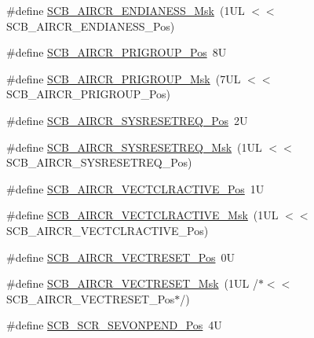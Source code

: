 \begin{DoxyCompactItemize}
\item 
\#define \hyperlink{group___c_m_s_i_s___s_c_b_ga2f571f93d3d4a6eac9a3040756d3d951}{S\-C\-B\-\_\-\-A\-I\-R\-C\-R\-\_\-\-E\-N\-D\-I\-A\-N\-E\-S\-S\-\_\-\-Msk}~(1\-U\-L $<$$<$ S\-C\-B\-\_\-\-A\-I\-R\-C\-R\-\_\-\-E\-N\-D\-I\-A\-N\-E\-S\-S\-\_\-\-Pos)
\item 
\#define \hyperlink{group___c_m_s_i_s___s_c_b_gaca155deccdeca0f2c76b8100d24196c8}{S\-C\-B\-\_\-\-A\-I\-R\-C\-R\-\_\-\-P\-R\-I\-G\-R\-O\-U\-P\-\_\-\-Pos}~8\-U
\item 
\#define \hyperlink{group___c_m_s_i_s___s_c_b_ga8be60fff03f48d0d345868060dc6dae7}{S\-C\-B\-\_\-\-A\-I\-R\-C\-R\-\_\-\-P\-R\-I\-G\-R\-O\-U\-P\-\_\-\-Msk}~(7\-U\-L $<$$<$ S\-C\-B\-\_\-\-A\-I\-R\-C\-R\-\_\-\-P\-R\-I\-G\-R\-O\-U\-P\-\_\-\-Pos)
\item 
\#define \hyperlink{group___c_m_s_i_s___s_c_b_gaffb2737eca1eac0fc1c282a76a40953c}{S\-C\-B\-\_\-\-A\-I\-R\-C\-R\-\_\-\-S\-Y\-S\-R\-E\-S\-E\-T\-R\-E\-Q\-\_\-\-Pos}~2\-U
\item 
\#define \hyperlink{group___c_m_s_i_s___s_c_b_gaae1181119559a5bd36e62afa373fa720}{S\-C\-B\-\_\-\-A\-I\-R\-C\-R\-\_\-\-S\-Y\-S\-R\-E\-S\-E\-T\-R\-E\-Q\-\_\-\-Msk}~(1\-U\-L $<$$<$ S\-C\-B\-\_\-\-A\-I\-R\-C\-R\-\_\-\-S\-Y\-S\-R\-E\-S\-E\-T\-R\-E\-Q\-\_\-\-Pos)
\item 
\#define \hyperlink{group___c_m_s_i_s___s_c_b_gaa30a12e892bb696e61626d71359a9029}{S\-C\-B\-\_\-\-A\-I\-R\-C\-R\-\_\-\-V\-E\-C\-T\-C\-L\-R\-A\-C\-T\-I\-V\-E\-\_\-\-Pos}~1\-U
\item 
\#define \hyperlink{group___c_m_s_i_s___s_c_b_ga212c5ab1c1c82c807d30d2307aa8d218}{S\-C\-B\-\_\-\-A\-I\-R\-C\-R\-\_\-\-V\-E\-C\-T\-C\-L\-R\-A\-C\-T\-I\-V\-E\-\_\-\-Msk}~(1\-U\-L $<$$<$ S\-C\-B\-\_\-\-A\-I\-R\-C\-R\-\_\-\-V\-E\-C\-T\-C\-L\-R\-A\-C\-T\-I\-V\-E\-\_\-\-Pos)
\item 
\#define \hyperlink{group___c_m_s_i_s___s_c_b_ga0d483d9569cd9d1b46ec0d171b1f18d8}{S\-C\-B\-\_\-\-A\-I\-R\-C\-R\-\_\-\-V\-E\-C\-T\-R\-E\-S\-E\-T\-\_\-\-Pos}~0\-U
\item 
\#define \hyperlink{group___c_m_s_i_s___s_c_b_ga3006e31968bb9725e7b4ee0784d99f7f}{S\-C\-B\-\_\-\-A\-I\-R\-C\-R\-\_\-\-V\-E\-C\-T\-R\-E\-S\-E\-T\-\_\-\-Msk}~(1\-U\-L /$\ast$$<$$<$ S\-C\-B\-\_\-\-A\-I\-R\-C\-R\-\_\-\-V\-E\-C\-T\-R\-E\-S\-E\-T\-\_\-\-Pos$\ast$/)
\item 
\#define \hyperlink{group___c_m_s_i_s___s_c_b_ga3bddcec40aeaf3d3a998446100fa0e44}{S\-C\-B\-\_\-\-S\-C\-R\-\_\-\-S\-E\-V\-O\-N\-P\-E\-N\-D\-\_\-\-Pos}~4\-U
\item 

\end{DoxyCompactItemize}
